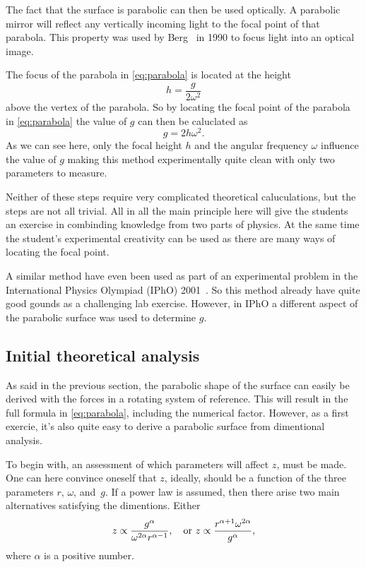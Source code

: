 \documentclass[11pt,towcolumn, swedish, english]{article}
\begin{document}
The fact that the surface is parabolic can then be used optically. A
parabolic mirror will reflect any vertically incoming light to the
focal point of that parabola. This property was used by
Berg~\cite{Berg1990} in 1990 to focus light into an optical image. 

The focus of the parabola in \eqref{eq:parabola} is located at the
height~\cite{Physics_Handbook} 
\begin{equation*}
h=\frac{g}{2\omega^2}
\end{equation*}
above the vertex of the parabola. So by locating the focal point of
the parabola in \eqref{eq:parabola} the value of $g$ can then be
caluclated as 
\begin{equation*}
g=2h\omega^2.
\end{equation*}
As we can see here, only the focal height $h$ and the angular
frequency $\omega$ influence the value of $g$ making this method
experimentally quite clean with only two parameters to measure. 

Neither of these steps require very complicated theoretical caluculations, but
the steps are not all trivial. All in all the main principle here will
give the students an exercise in combinding knowledge from two parts
of physics. At the same time the student's experimental creativity can
be used as there are many ways of locating the focal point. 

A similar method have even been used as part of an experimental
problem in the International Physics Olympiad (IPhO\footnotemark{})
2001~\cite{IPhO2001}. So this method already have quite good gounds as
a challenging lab exercise. However, in IPhO a different aspect of the
parabolic surface was used to determine $g$. 

\subsection{Initial theoretical analysis}
As said in the previous section, the parabolic shape of the surface
can easily be derived with the forces in a rotating system of
reference. This will result in the full formula in
\eqref{eq:parabola}, including the numerical factor. 
However, as a first exercie, it's also quite easy to derive a parabolic
surface from dimentional analysis. 

To begin with, an assessment of which parameters will affect $z$, must
be made. One can here convince oneself that $z$, ideally, should be a
function of the three parameters $r$, $\omega$, and~$g$.
If a power law is assumed,
then there arise two main alternatives satisfying the
dimentions. Either
\begin{equation*}
z\propto\frac{g^\alpha}{\omega^{2\alpha} r^{\alpha-1}}
\qcomma \text{or } z\propto\frac{r^{\alpha+1}\omega^{2\alpha}}{g^\alpha},
\end{equation*}
where $\alpha$ is a positive number. 
\end{document}

